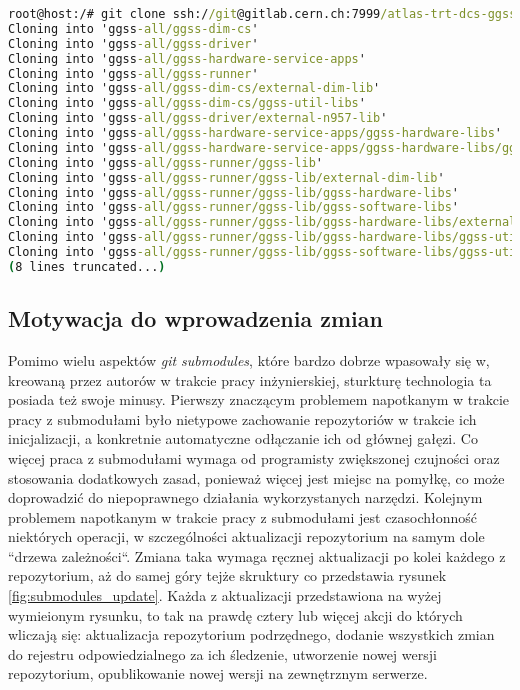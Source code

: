\begin{lstlisting}[language=cmd, caption={Inicjalizacja pełnej sturktury projektu jedną komendą.}, label={lst:initialize}]
root@host:/# git clone ssh://git@gitlab.cern.ch:7999/atlas-trt-dcs-ggss/ggss-all.git && cd ggss-all && git submodule update --init --recursive
Cloning into 'ggss-all/ggss-dim-cs'
Cloning into 'ggss-all/ggss-driver'
Cloning into 'ggss-all/ggss-hardware-service-apps'
Cloning into 'ggss-all/ggss-runner'
Cloning into 'ggss-all/ggss-dim-cs/external-dim-lib'
Cloning into 'ggss-all/ggss-dim-cs/ggss-util-libs'
Cloning into 'ggss-all/ggss-driver/external-n957-lib'
Cloning into 'ggss-all/ggss-hardware-service-apps/ggss-hardware-libs'
Cloning into 'ggss-all/ggss-hardware-service-apps/ggss-hardware-libs/ggss-util-libs'
Cloning into 'ggss-all/ggss-runner/ggss-lib'
Cloning into 'ggss-all/ggss-runner/ggss-lib/external-dim-lib'
Cloning into 'ggss-all/ggss-runner/ggss-lib/ggss-hardware-libs'
Cloning into 'ggss-all/ggss-runner/ggss-lib/ggss-software-libs'
Cloning into 'ggss-all/ggss-runner/ggss-lib/ggss-hardware-libs/external-n957-lib'
Cloning into 'ggss-all/ggss-runner/ggss-lib/ggss-hardware-libs/ggss-util-libs'
Cloning into 'ggss-all/ggss-runner/ggss-lib/ggss-software-libs/ggss-util-libs'
(8 lines truncated...)
\end{lstlisting}


\subsection{Motywacja do wprowadzenia zmian}

Pomimo wielu aspektów \emph{git submodules}, które bardzo dobrze wpasowały się w, kreowaną przez autorów w trakcie pracy inżynierskiej, sturkturę technologia ta posiada też swoje minusy. Pierwszy znaczącym problemem napotkanym w trakcie pracy z submodułami było nietypowe zachowanie repozytoriów w trakcie ich inicjalizacji, a konkretnie automatyczne odłączanie ich od głównej gałęzi. Co więcej praca z submodułami wymaga od programisty zwiększonej czujności oraz stosowania dodatkowych zasad, ponieważ więcej jest miejsc na pomyłkę, co może doprowadzić do niepoprawnego działania wykorzystanych narzędzi. Kolejnym problemem napotkanym w trakcie pracy z submodułami jest czasochłonność niektórych operacji, w szczególności aktualizacji repozytorium na samym dole ``drzewa zależności``. Zmiana taka wymaga ręcznej aktualizacji po kolei każdego z repozytorium, aż do samej góry tejże skruktury co przedstawia rysunek \ref {fig:submodules_update}. Każda z aktualizacji przedstawiona na wyżej wymieionym rysunku, to tak na prawdę cztery lub więcej akcji do których wliczają się: aktualizacja repozytorium podrzędnego, dodanie wszystkich zmian do rejestru odpowiedzialnego za ich śledzenie, utworzenie nowej wersji repozytorium, opublikowanie nowej wersji na zewnętrznym serwerze.

